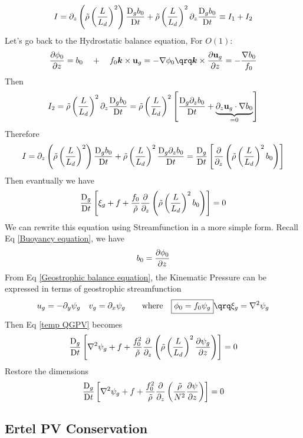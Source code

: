 \documentclass[../SQG_notes.tex]{subfiles}
\begin{document}
    \[ I = \partial_z \left(\tilde{\rho} \left(\frac{L}{L_d}\right)^2\right) \frac{\mathrm{D}_g b_0}{\mathrm{D} t} + \tilde{\rho} \left(\frac{L}{L_d}\right)^2 \partial_z \frac{\mathrm{D}_g b_0}{\mathrm{D} t} \equiv I_1 + I_2\]
    Let's go back to the Hydrostatic balance equation, 
    For $O(1)$:
    \[ \frac{\p \phi_0}{\p z} = b_0 \quad + \quad f_0 \bm{k} \times \bu_g = -\nabla \phi_0 \qrq \bm{k} \times \frac{\p \bu_g}{\p z} = -\frac{\nabla b_0}{f_0}\]
    Then 
    \[ I_2  =\tilde{\rho} \left(\frac{L}{L_d}\right)^2 \partial_z \frac{\mathrm{D}_g b_0}{\mathrm{D} t}= \tilde{\rho} \left(\frac{L}{L_d}\right)^2 \left[\frac{\mathrm{D}_g \partial_z b_0}{\mathrm{D} t} + \underbrace{\partial_z \mathbf{u}_g \cdot \nabla b_0}_{ = 0}\right]\]
    Therefore
    \[ I = \partial_z \left(\tilde{\rho} \left(\frac{L}{L_d}\right)^2\right) \frac{\mathrm{D}_g b_0}{\mathrm{D} t} +  \tilde{\rho} \left(\frac{L}{L_d}\right)^2 \frac{\mathrm{D}_g \partial_z b_0}{\mathrm{D} t} = \frac{\mathrm{D}_g}{\mathrm{D} t} \left[\frac{\partial}{\partial_z}\left(\tilde{\rho} \left(\frac{L}{L_d}\right)^2 b_0\right)\right]\]
    Then evantually we have 
    \begin{equation}
        \frac{\mathrm{D}_g}{\mathrm{D} t} \left[ \xi_g + f + \frac{f_0}{\tilde{\rho}}\frac{\partial}{\partial_z}\left(\tilde{\rho} \left(\frac{L}{L_d}\right)^2 b_0\right)\right] = 0 \label{temp QGPV}
    \end{equation}
    We can rewrite this equation using Streamfunction in a more simple form. Recall Eq \ref{Buoyancy equation}, we have 
    \[ b_0 = \frac{\partial \phi_0}{\partial z}\]
    From Eq \ref{Geostrophic balance equation}, the Kinematic Pressure can be expressed in terms of geostrophic streamfunction 
    \[ u_g = -\p_y \psi_g \quad v_g = \p_x \psi_g \qquad \text{where} \quad \boxed{\phi_0 = f_0 \psi_g} \qrq \xi_g = \nabla^2 \psi_g\]
    Then Eq \ref{temp QGPV} becomes 
    \begin{equation}
         \frac{\mathrm{D}_g}{\mathrm{D} t} \left[ \nabla^2 \psi_g + f + \frac{f_0^2}{\tilde{\rho}}\frac{\partial}{\partial_z}\left(\tilde{\rho} \left(\frac{L}{L_d}\right)^2 \frac{\partial \psi_g}{\partial z}\right)\right] = 0 \label{dimensionless QGPV}
    \end{equation}
    Restore the dimensions
    \begin{equation}
        \frac{\mathrm{D}_g}{\mathrm{D} t} \left[ \nabla^2 \psi_g + f + \frac{f_0^2}{\tilde{\rho}}\frac{\partial }{\partial_z} \left( \frac{\tilde{\rho}}{N^2} \frac{\partial \psi}{\partial z}\right)\right] = 0 \label{QGPV equation}
    \end{equation}

    \subsection{Ertel PV Conservation}
\end{document}
